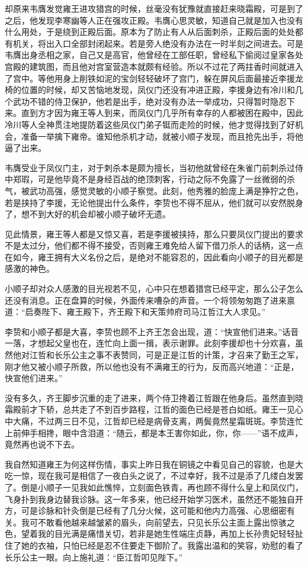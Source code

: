 却原来韦膺发觉雍王进攻猎宫的时候，丝毫没有犹豫就直接赶来晓霜殿，可是到了之后，他发现李寒幽等人正在强攻正殿。韦膺心思灵敏，知道自己就是加入也没有什么用处，于是绕到正殿后面。原本为了防止有人从后面刺杀，正殿后面的处处都有机关，将出入口全部封闭起来。若是旁人绝没有办法在一时半刻之间进去。可是韦膺出身丞相之家，自己又是高官，他曾经在工部任职，曾经私下偷阅过皇家各处宫殿的建筑图，而且他对宫室营造本就颇有经验。所以不过花了两拄香时间就进入了宫中。等他用身上削铁如泥的宝剑轻轻破坏了宫门，躲在屏风后面最接近李援龙椅的位置的时候，却又苦恼地发现，凤仪门还没有冲进正殿，李援身边有冷川和几个武功不错的侍卫保护，他若是出手，绝对没有办法一举成功，只得暂时隐忍下来。直到方才因为雍王等人到来，而凤仪门几乎所有幸存的人都被困在殿中，因此冷川等人全神贯注地提防着这些凤仪门弟子铤而走险的时候，他才觉得找到了好机会，准备一举擒下雍帝。谁知他杀机才动，就被小顺子发现，而且抢先出手，将他逼了出来。

韦膺受业于凤仪门主，对于刺杀本是颇为擅长，当初他就曾经在朱雀门前刺杀过侍中郑瑕，可是他毕竟不是身经百战的绝顶刺客，行动之际不免露了一丝微弱的杀气，被武功高强，感觉灵敏的小顺子察觉。此刻，他秀雅的脸庞上满是狰狞之色，若是挟持了李援，无论他提出什么条件，李贽也不得不屈从，他们就可以安然脱身了，想不到大好的机会却被小顺子破坏无遗。

见此情景，雍王等人都是又惊又喜，若是李援被挟持，那么只要凤仪门提出的要求不是太过分，他们都不得不接受，否则雍王难免给人留下借刀杀人的话柄，这一点在如今，雍王拥有大义名份之后，是绝对不能容忍的，因此看向小顺子的目光都是感激的神色。

小顺子却对众人感激的目光视若不见，心中只在想着猎宫已经平定，那么公子怎么还没有消息。正在盘算的时候，外面传来嘈杂的声音。一个将领匆匆跑了进来禀道：“启奏陛下、雍王殿下，齐王殿下和天策帅府司马江哲江大人求见。”

李贽和小顺子都是大喜，李贽也顾不上齐王怎会出现，道：“快宣他们进来。”话音一落，才想起父皇也在，连忙向上面一揖，表示谢罪。此刻李援却也十分欢喜，虽然他对江哲和长乐公主之事不表赞同，可是正是江哲的计策，才召来了勤王之军，刚才他又被小顺子所救，所以他也没有不满雍王的行为，反而高兴地道：“正是，快宣他们进来。”

没有多久，齐王脚步沉重的走了进来，两个侍卫搀着江哲跟在他身后。虽然直到晓霜殿前才下轿，总共走了不到百步路程，江哲的面色已经是苍白如纸。雍王一见心中大痛，不过两三日不见，江哲却已经是病骨支离，两鬓竟然星霜斑斑。李贽连忙上前伸手相搀，眼中含泪道：“随云，都是本王害你如此，你，你——”语不成声，竟然再也说不下去。

我自然知道雍王为何这样伤情，事实上昨日我在铜镜之中看见自己的容貌，也是大吃一惊，现在我可是相信了一夜白头之说了，不过幸好，我不过是添了几缕白发罢了。倒是小顺子一见我如此憔悴，立刻面色铁青，再也顾不得什么皇上和凤仪门，飞身扑到我身边替我诊脉。这一年多来，他已经开始学习医术，虽然还不能独自开方，可是诊脉和针灸倒是已经有了几分火候，这可能和他内力高强、心思细密有关。我可不敢看他越来越皱紧的眉头，向前望去，只见长乐公主面上露出惊骇之色，望着我的目光满是痛惜关切，若非是她生性端庄贞静，再加上长孙贵妃轻轻扯住了她的衣袖，只怕已经是忍不住要走下御阶了。我露出温和的笑容，劝慰的看了长乐公主一眼。向上施礼道：“臣江哲叩见陛下。”

